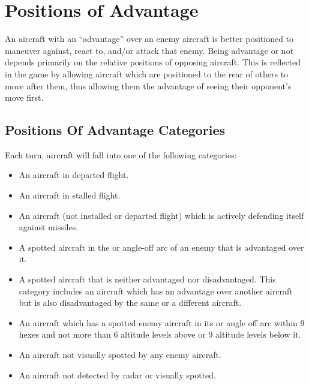 \section{Positions of Advantage}
\label{rule:positions-of-advantage}

An aircraft with an “advantage” over an enemy aircraft is better positioned to maneuver against, react to, and/or attack that enemy. Being advantage or not depends primarily on the relative positions of opposing aircraft. This is reflected in the game by allowing aircraft which are positioned to the rear of others to move after them, thus allowing them the advantage of seeing their opponent's move first.

\subsection{Positions Of Advantage Categories} Each turn, aircraft will fall into one of the following categories:

\begin{itemize}


    \item{} An aircraft in departed flight.

    \item{} An aircraft in stalled flight.

    \item{} An aircraft (not installed or departed flight) which is actively defending itself against missiles.

    \item{} A spotted aircraft in the  or  angle-off arc of an enemy that is advantaged over it.

    \item{} A spotted aircraft that is neither advantaged nor disadvantaged. This category includes an aircraft which has an advantage over another aircraft but is also disadvantaged by the same or a different aircraft.

    \item{} An aircraft which has a spotted enemy aircraft in its  or  angle off arc within 9 hexes and not more than 6 altitude levels above or 9 altitude levels below it. 

    \item{} An aircraft not visually spotted by any enemy aircraft.

    \item{} An aircraft not detected by radar or visually spotted.

\end{itemize}

